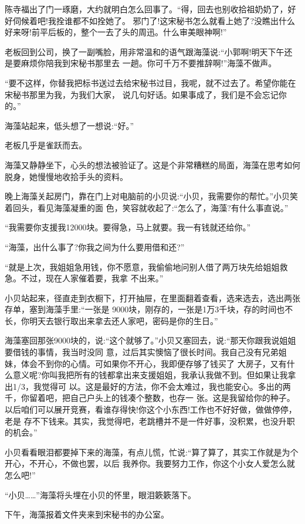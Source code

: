 \documentclass[11pt,a4paper,onecolumn]{article}
\begin{document}
陈寺福出了门一琢磨，大约就明白怎么回事了。``得，回去也别收拾祖奶奶了，好好伺候着吧!我拴谁都不如拴她了。
邪门了!这宋秘书怎么就看上她了?没瞧出什么好来呀!前平后板的，整个一去了头的周迅。什么审美眼神啊!''

老板回到公司，换了一副嘴脸，用非常温和的语气跟海藻说:``小郭啊!明天下午还是要麻烦你陪我到宋秘书那里去
一趟。你可千万不要推辞啊!''海藻不做声。

``要不这样，你替我把标书送过去给宋秘书过目，我呢，就不过去了。希望你能在宋秘书那里为我，为我们大家，
说几句好话。如果事成了，我们是不会忘记你的。''

海藻站起来，低头想了一想说:``好。''

老板几乎是雀跃而去。

海藻又静静坐下，心头的想法被验证了。这是个非常糟糕的局面，海藻在思考如何脱身，她慢慢地收拾手头的资料。

晚上海藻关起房门，靠在门上对电脑前的小贝说:``小贝，我需要你的帮忙。''小贝笑着回头，看见海藻凝重的面
色，笑容就收起了:``怎么了，海藻?有什么事直说。''

``我需要你支援我12000块。要得急，马上就要。我一有钱就还给你。''

``海藻，出什么事了?你我之间为什么要用借和还?''

``就是上次，我姐姐急用钱，你不愿意，我偷偷地问别人借了两万块先给姐姐救急。不过，现在人家催着要，我拿
不出来。''

小贝站起来，径直走到衣橱下，打开抽屉，在里面翻着查看，选来选去，选出两张存单，塞到海藻手里:``一张是
9000块，刚存的，一张是1万3千块，存的时间也不长，你明天去银行取出来拿去还人家吧，密码是你的生日。''

海藻塞回那张9000块的，说:``这个就够了。''小贝又塞回去，说:``那天你跟我说姐姐要借钱的事情，我当时没同
意，过后其实懊恼了很长时间。我自己没有兄弟姐妹，体会不到你的心情。可如果你不开心，我即便存够了钱买了
大房子，又有什么意义呢?你叫我把所有的钱都拿出来支援姐姐，我承认我做不到。但如果让我拿出1/3，我觉得可
以。这是最好的方法，你不会太难过，我也能安心。多出的两千，你留着吧，把自己户头上的钱凑个整数，也存一
张。这是我留给你的种子。以后咱们可以展开竞赛，看谁存得快!你这个小东西!工作也不好好做，做做停停，老是
存不下钱来。其实，我觉得吧，老跳槽并不是一件好事，没积累，也没升职的机会。''

小贝看看眼泪都要掉下来的海藻，有点儿慌，忙说:``算了算了，其实工作就是为个开心，不开心，不做也罢，以后
我养你。我要努力工作，你这个小女人爱怎么就怎么吧!''

``小贝……''海藻将头埋在小贝的怀里，眼泪簌簌落下。

下午，海藻报着文件夹来到宋秘书的办公室。
\end{document}
